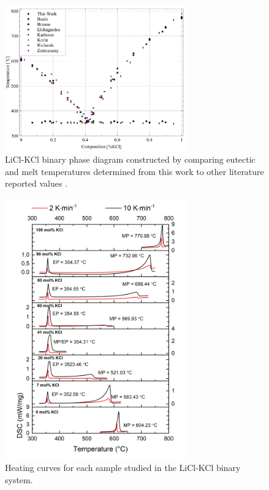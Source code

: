 \documentclass[review]{elsarticle}
\begin{document}
\begin{figure}[h]
 \centering
 \includegraphics[width=0.7\textwidth]{images/DSCanalysis.jpg} 
 \caption{LiCl-KCl binary phase diagram constructed by comparing eutectic and melt temperatures determined from this work to other literature reported values \cite{RN79,RN78,RN77,RN76,RN75,RN16}.}
 \label{fig:figureDSC}
\end{figure}

 

\begin{figure}[]
 \centering
 \includegraphics[width=0.7\textwidth]{images/DSCheatcurves.jpg} 
 \caption{Heating curves for each sample studied in the LiCl-KCl binary system. }
 \label{fig:figureDSC2}
\end{figure}
\end{document}
